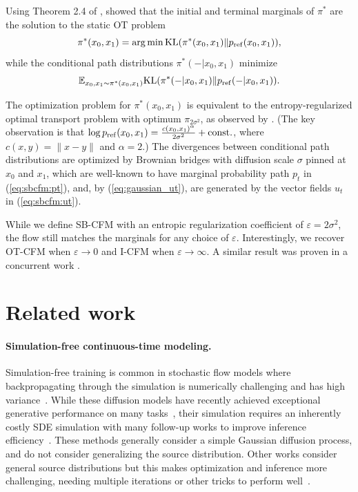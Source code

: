 \documentclass[10pt]{article}
\theoremstyle{plain}
\theoremstyle{definition}
\theoremstyle{remark}
\begin{document}
\begin{proofE} 
Using Theorem 2.4 of \citet{leonard_path_measures}, \citet{de_bortoli_diffusion_2021} showed that the initial and terminal marginals of $\pi^*$ are the solution to the static OT problem
\begin{equation*}
\pi^*(x_0,x_1)=\operatorname*{arg\,min}{\rm KL}(\pi^*(x_0,x_1)\|p_{\rm ref}(x_0,x_1)),
\end{equation*}
while the conditional path distributions $\pi^*(-|x_0,x_1)$ minimize \[\mathbb{E}_{x_0,x_1\sim\pi^*(x_0,x_1)} {\rm KL}(\pi^*(-|x_0,x_1)\|p_{\rm ref}(-|x_0,x_1)).\]

The optimization problem for $\pi^*(x_0,x_1)$ is equivalent to the entropy-regularized optimal transport problem with optimum $\pi_{2\sigma^2}$, as observed by \citet{de_bortoli_diffusion_2021}. (The key observation is that $\log p_{\rm ref}(x_0,x_1)=\frac{c(x_0,x_1)^\alpha}{2\sigma^2}+{\rm const.}$, where $c(x,y)=\|x-y\|$ and $\alpha=2$.) The divergences between conditional path distributions are optimized by Brownian bridges with diffusion scale $\sigma$ pinned at $x_0$ and $x_1$, which are well-known to have marginal probability path $p_t$ in (\ref{eq:sbcfm:pt}), and, by (\ref{eq:gaussian_ut}), are generated by the vector fields $u_t$ in (\ref{eq:sbcfm:ut}). %
\end{proofE}

While we define SB-CFM  with an entropic regularization coefficient of $\varepsilon=2\sigma^2$, the flow still matches the marginals for any choice of $\varepsilon$. Interestingly, we recover OT-CFM when $\varepsilon \to 0$ and I-CFM when $\varepsilon \to \infty$. {A similar result was proven in a concurrent work \cite{pooladian_2023_multisample}.}

\section{Related work}\label{sec:rw}
%

\paragraph{Simulation-free continuous-time modeling.} Simulation-free training is common in stochastic flow models where backpropagating through the simulation is numerically challenging and has high variance~\citep{li_scalable_2020}. While these diffusion models have recently achieved exceptional generative performance on many tasks~\citep{sohl-dickstein_deep_2015,song_generative_2019,song_improved_2020,ho_denoising_2020,song_score-based_2021,dhariwal_diffusion_2021,watson_broadly_2022}, their simulation requires an inherently costly SDE simulation with many follow-up works to improve inference efficiency~\citep{lu_dpm-solver_2022,salimans_progressive_2022,watson_learning_2022,song_denoising_2021,bao_analytic-dpm_2022}. These methods generally consider a simple Gaussian diffusion process, and do not consider generalizing the source distribution. Other works consider general source distributions but this makes optimization and inference more challenging, needing multiple iterations or other tricks to perform well~\citep{wang_deep_2021,de_bortoli_diffusion_2021,vargas_solving_2021}.
\end{document}
